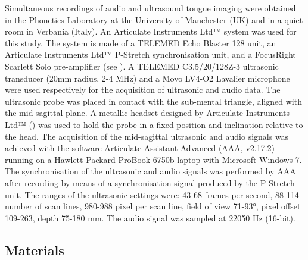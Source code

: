 \documentclass[12pt,]{article}
\begin{document}
\label{s:equipment}

Simultaneous recordings of audio and ultrasound tongue imaging were
obtained in the Phonetics Laboratory at the University of Manchester
(UK) and in a quiet room in Verbania (Italy). An Articulate Instruments
Ltd™ system was used for this study. The system is made of a TELEMED
Echo Blaster 128 unit, an Articulate Instruments Ltd™ P-Stretch
synchronisation unit, and a FocusRight Scarlett Solo pre-amplifier (see
). A TELEMED C3.5/20/128Z-3 ultrasonic transducer
(20mm radius, 2-4 MHz) and a Movo LV4-O2 Lavalier microphone were used
respectively for the acquisition of ultrasonic and audio data. The
ultrasonic probe was placed in contact with the sub-mental triangle,
aligned with the mid-sagittal plane. A metallic headset designed by
Articulate Instruments Ltd™ (\citeyear{articulate2008}) was used to hold
the probe in a fixed position and inclination relative to the head. The
acquisition of the mid-sagittal ultrasonic and audio signals was
achieved with the software Articulate Assistant Advanced (AAA, v2.17.2)
running on a Hawlett-Packard ProBook 6750b laptop with Microsoft Windows
7. The synchronisation of the ultrasonic and audio signals was performed
by AAA after recording by means of a synchronisation signal produced by
the P-Stretch unit. The ranges of the ultrasonic settings were: 43-68
frames per second, 88-114 number of scan lines, 980-988 pixel per scan
line, field of view 71-93°, pixel offset 109-263, depth 75-180 mm. The
audio signal was sampled at 22050 Hz (16-bit).

\hypertarget{materials}{%
\subsection{Materials}\label{materials}}
\end{document}
